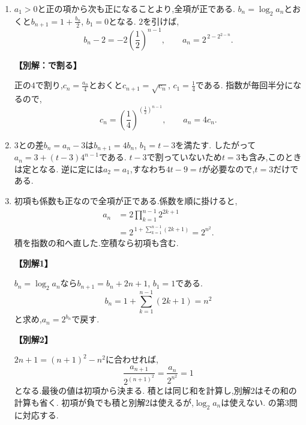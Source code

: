 \begin{enumerate}[label=\textbf{問\arabic*.},leftmargin=3.8em,format=\bookitemlink{practice-basic}{solution}{problem}]
  \item {}\BookMathLayout{}{\\}
    $a_1>0$と正の項から次も正になることより,全項が正である.
    $b_n=\log_2a_n$とおくと$b_{n+1}=1+\frac{b_n}{2}$, $b_1=0$となる.
    $2$を引けば,
    \[
      b_n-2=-2\left(\frac12\right)^{n-1},
      \qquad a_n=2^{\,2-2^{2-n}}.
    \]
    \par\smallskip\noindent\textbf{【別解：で割る】}\par
    正の$4$で割り,$c_n=\frac{a_n}{4}$とおくと$c_{n+1}=\sqrt{c_n}$, $c_1=\frac{1}{4}$である.
    指数が毎回半分になるので,
    \[
      c_n=\left(\frac14\right)^{(\frac12)^{n-1}},
      \qquad a_n=4c_n.
    \]

  \item {}\BookMathLayout{}{\\}
    $3$との差$b_n=a_n-3$は$b_{n+1}=4b_n$, $b_1=t-3$を満たす.
    したがって$a_n=3+(t-3)4^{n-1}$である.
    $t-3$で割っていないため$t=3$も含み,このときは定となる.
    逆に定には$a_2=a_1$,すなわち$4t-9=t$が必要なので,$t=3$だけである.

  \item {}\BookMathLayout{}{\\}
    初項も係数も正なので全項が正である.係数を順に掛けると,
    \[
      \begin{aligned}
        a_n&=2\prod_{k=1}^{n-1}2^{2k+1}\\
        &=2^{\,1+\sum_{k=1}^{n-1}(2k+1)}=2^{n^2}.
      \end{aligned}
    \]
    積を指数の和へ直した.空積なら初項も含む.
    \par\smallskip\noindent\textbf{【別解1】}\par
    $b_n=\log_2a_n$なら$b_{n+1}=b_n+2n+1$, $b_1=1$である.
    \[
      b_n=1+\sum_{k=1}^{n-1}(2k+1)=n^2
    \]
    と求め,$a_n=2^{b_n}$で戻す.
    \par\smallskip\noindent\textbf{【別解2】}\par
    $2n+1=(n+1)^2-n^2$に合わせれば,
    \[
      \frac{a_{n+1}}{2^{(n+1)^2}}=\frac{a_n}{2^{n^2}}=1
    \]
    となる.最後の値は初項から決まる.
    積とは同じ和を計算し,別解2はその和の計算も省く.
    初項が負でも積と別解2は使えるが,$\log_2a_n$は使えない.
    の第3問に対応する.


\end{enumerate}
